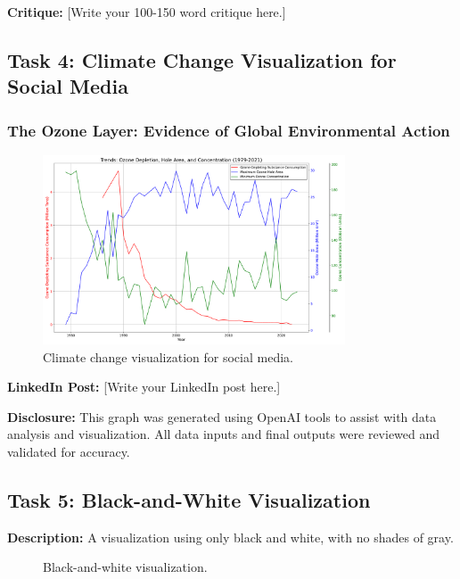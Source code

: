 \documentclass[a4paper,landscape]{article}
\begin{document}
\textbf{Critique:}
[Write your 100-150 word critique here.]

\subsection{Task 4: Climate Change Visualization for Social Media}
\subsubsection{The Ozone Layer: Evidence of Global Environmental Action}

\begin{figure}[H]
    \centering
    \includegraphics[width=0.8\textwidth]{ozone_data_visualization_t4.pdf} %
    \caption{Climate change visualization for social media.}
    \label{fig:climate}
\end{figure}

\newpage

\textbf{LinkedIn Post:}
[Write your LinkedIn post here.]

\textbf{Disclosure:} This graph was generated using OpenAI tools to assist with data analysis and visualization. All data inputs and final outputs were reviewed and validated for accuracy.

\subsection{Task 5: Black-and-White Visualization}
\textbf{Description:} A visualization using only black and white, with no shades of gray.

\begin{figure}[H]
    \centering
    \caption{Black-and-white visualization.}
    \label{fig:bw}
\end{figure}
\end{document}
